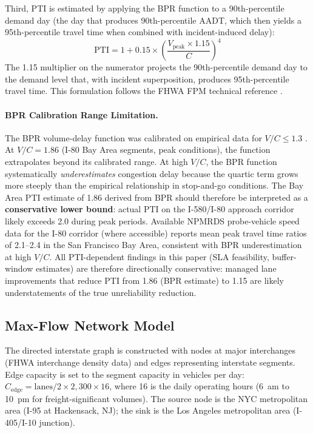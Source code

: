 Third, PTI is estimated by applying the BPR function to a 90th-percentile demand day (the day that produces 90th-percentile AADT, which then yields a 95th-percentile travel time when combined with incident-induced delay):
\begin{equation}
  \text{PTI} = 1 + 0.15 \times \left( \frac{V_{\text{peak}} \times 1.15}{C} \right)^4
  \label{eq:bpr_pti}
\end{equation}
The 1.15 multiplier on the numerator projects the 90th-percentile demand day to the demand level that, with incident superposition, produces 95th-percentile travel time. This formulation follows the FHWA FPM technical reference \citep{FHWA_freight2023}.

\paragraph{BPR Calibration Range Limitation.}
The BPR volume-delay function was calibrated on empirical data for $V/C \leq 1.3$
\citep{HCM7}. At $V/C = 1.86$ (I-80 Bay Area segments, peak conditions), the function
extrapolates beyond its calibrated range. At high $V/C$, the BPR function
systematically \textit{underestimates} congestion delay because the quartic term grows
more steeply than the empirical relationship in stop-and-go conditions. The Bay Area PTI
estimate of 1.86 derived from BPR should therefore be interpreted as a \textbf{conservative
lower bound}: actual PTI on the I-580/I-80 approach corridor likely exceeds 2.0 during
peak periods. Available NPMRDS probe-vehicle speed data for the I-80 corridor (where
accessible) reports mean peak travel time ratios of 2.1--2.4 in the San Francisco Bay
Area, consistent with BPR underestimation at high $V/C$. All PTI-dependent findings in
this paper (SLA feasibility, buffer-window estimates) are therefore directionally
conservative: managed lane improvements that reduce PTI from 1.86 (BPR estimate) to 1.15
are likely understatements of the true unreliability reduction.

\subsection{Max-Flow Network Model}

The directed interstate graph is constructed with nodes at major interchanges (FHWA interchange density data) and edges representing interstate segments. Edge capacity is set to the segment capacity in vehicles per day: $C_{\text{edge}} = \text{lanes}/2 \times 2{,}300 \times 16$, where 16 is the daily operating hours (6~am to 10~pm for freight-significant volumes). The source node is the NYC metropolitan area (I-95 at Hackensack, NJ); the sink is the Los Angeles metropolitan area (I-405/I-10 junction).

